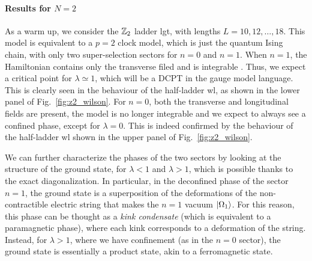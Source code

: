 \smallskip

%     



\paragraph{Results for \texorpdfstring{$N=2$}{N=2}}
As a warm up, we consider the $\mathbb{Z}_2$ ladder \ac{lgt}, with lengths $L=10,12,\dots,18$.
This model is equivalent to a $p=2$ clock model, which is just the quantum Ising chain, with only two super-selection sectors for $n=0$ and $n=1$.
When $n=1$, the Hamiltonian  contains only the transverse filed and is integrable \cite{baxter1982exactlysm}.
Thus, we expect a critical point for $\lambda \simeq 1$, which will be a DCPT in the gauge model language.
This is clearly seen in the behaviour of the half-ladder \ac{wl}, as shown in the lower panel of Fig.~\ref{fig:z2_wilson}.
For $n=0$, both the transverse and longitudinal fields  are present, the model is no longer integrable  \cite{banuls2011thermalization, kormos2017confinement, pomponio2022bloch} and we expect to always see a confined phase, except for $\lambda = 0$.
This is indeed confirmed by the behaviour of the half-ladder \ac{wl} shown in the upper panel of Fig.~\ref{fig:z2_wilson}.

We can further characterize the phases of the two sectors by looking at the structure of the ground state, for $\lambda<1$ and $\lambda>1$, which is possible thanks to the exact diagonalization.
In particular, in the deconfined phase of the sector $n=1$, the ground state is a superposition of the deformations of the non-contractible electric string that makes the $n=1$ vacuum $\ket{\Omega_1}$.
For this reason, this phase can be thought as a \emph{kink condensate} \cite{fradkin1978order} (which is equivalent to a paramagnetic phase), where each kink corresponds to a deformation of the string.
Instead, for $\lambda > 1$, where we have confinement (as in the $n=0$ sector), the ground state is essentially a product state, akin to a ferromagnetic state. %


